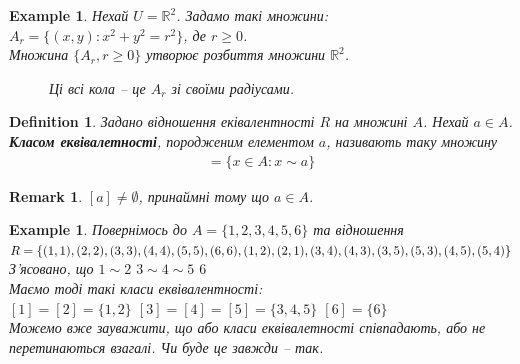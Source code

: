 \documentclass[a4paper, 14pt]{extarticle}
\theoremstyle{theoremdd}
\theoremstyle{theoremdd}
\newtheorem{definition}[theorem]{Definition}
\theoremstyle{theoremdd}
\theoremstyle{theoremdd}
\theoremstyle{theoremdd}
\newtheorem{example}[theorem]{Example}
\theoremstyle{theoremdd}
\theoremstyle{theoremdd}
\theoremstyle{theoremdd}
\theoremstyle{theoremdd}
\theoremstyle{theoremdd}
\theoremstyle{theoremdd}
\newtheorem{remark}[theorem]{Remark}
\theoremstyle{theoremdd}
\theoremstyle{theoremdd}
\theoremstyle{theoremdd}
\theoremstyle{theoremdd}
\begin{document}
\begin{example}
Нехай $U = \mathbb{R}^2$. Задамо такі множини:\\
$A_r = \{(x,y): x^2+y^2 = r^2\}$, де $r \geq 0$.\\
Множина $\{A_r, r \geq 0\}$ утворює розбиття множини $\mathbb{R}^2$.
\begin{figure}[H]
\centering
{}
\caption*{Ці всі кола -- це $A_r$ зі своїми радіусами.}
\end{figure}
\end{example}

\begin{definition}
Задано відношення еківалентності $R$ на множині $A$. Нехай $a \in A$.\\
\textbf{Класом еквівалетності}, породженим елементом $a$, називають таку множину
\begin{align*}
[a] = \{x \in A: x \sim a\}
\end{align*}
\end{definition}

\begin{remark}
$[a] \neq \emptyset$, принаймні тому що $a \in A$.
\end{remark}

\begin{example}
Повернімось до $A = \{1,2,3,4,5,6\}$ та відношення\\
$R = \{(1,1),(2,2),(3,3),(4,4),(5,5),(6,6),(1,2),(2,1),(3,4),(4,3),(3,5), \\ (5,3),(4,5),(5,4)\}$\\
З'ясовано, що $1 \sim 2$ \hspace{0.5cm} $3 \sim 4 \sim 5$ \hspace{0.5cm} $6$\\
Маємо тоді такі класи еквівалентності:\\
$[1] = [2] = \{1,2\}$ \hspace{0.5cm} $[3] = [4] = [5] = \{3,4,5\}$ \hspace{0.5cm} $[6] = \{6\}$\\
Можемо вже зауважити, що або класи еквівалетності співпадають, або не перетинаються взагалі. Чи буде це завжди -- так.
\end{example}
\end{document}
